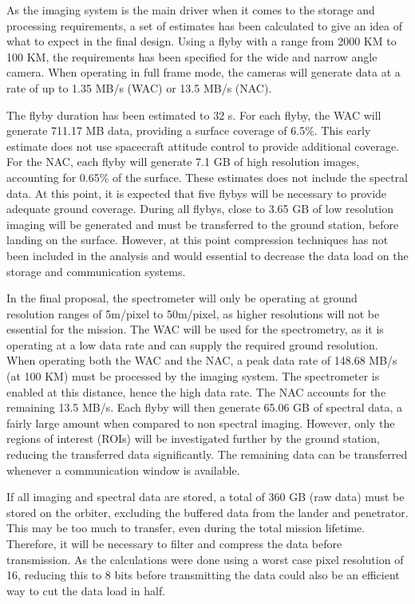 As the imaging system is the main driver when it comes to the storage and processing requirements, a set of estimates has been calculated to give an idea of what to expect in the final design. Using a flyby with a range from 2000 KM to 100 KM, the requirements has been specified for the wide and narrow angle camera. When operating in full frame mode, the cameras will generate data at a rate of up to 1.35 MB/s (WAC) or 13.5 MB/s (NAC).

The flyby duration has been estimated to 32 s. For each flyby, the WAC will generate 711.17 MB data, providing a surface coverage of 6.5\%. This early estimate does not use spacecraft attitude control to provide additional coverage. For the NAC, each flyby will generate 7.1 GB of high resolution images, accounting for 0.65\% of the surface. These estimates does not include the spectral data. At this point, it is expected that five flybys will be necessary to provide adequate ground coverage. During all flybys, close to 3.65 GB of low resolution imaging will be generated and must be transferred to the ground station, before landing on the surface. However, at this point compression techniques has not been included in the analysis and would essential to decrease the data load on the storage and communication systems.

In the final proposal, the spectrometer will only be operating at ground resolution ranges of 5m/pixel to 50m/pixel, as higher resolutions will not be essential for the mission. The WAC will be used for the spectrometry, as it is operating at a low data rate and can supply the required ground resolution. When operating both the WAC and the NAC, a peak data rate of 148.68 MB/s (at 100 KM) must be processed by the imaging system. The spectrometer is enabled at this distance, hence the high data rate. The NAC accounts for the remaining 13.5 MB/s. Each flyby will then generate 65.06 GB of spectral data, a fairly large amount when compared to non spectral imaging. However, only the regions of interest (ROIs) will be investigated further by the ground station, reducing the transferred data significantly. The remaining data can be transferred whenever a communication window is available. 

If all imaging and spectral data are stored, a total of 360 GB (raw data) must be stored on the orbiter,  excluding the buffered data from the lander and penetrator. This may be too much to transfer, even during the total mission lifetime. Therefore, it will be necessary to filter and compress the data before transmission. As the calculations were done using a worst case pixel resolution of 16, reducing this to 8 bits before transmitting the data could also be an efficient way to cut the data load in half.
